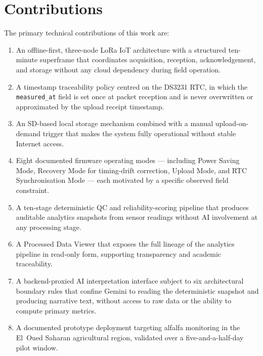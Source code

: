 \section*{Contributions}

The primary technical contributions of this work are:

\begin{enumerate}
  \item An offline-first, three-node LoRa IoT architecture with a structured
        ten-minute superframe that coordinates acquisition, reception, acknowledgement,
        and storage without any cloud dependency during field operation.
  \item A timestamp traceability policy centred on the DS3231 RTC, in which the
        \texttt{measured\_at} field is set once at packet reception and is never
        overwritten or approximated by the upload receipt timestamp.
  \item An SD-based local storage mechanism combined with a manual upload-on-demand
        trigger that makes the system fully operational without stable Internet
        access.
  \item Eight documented firmware operating modes — including Power Saving Mode,
        Recovery Mode for timing-drift correction, Upload Mode, and RTC
        Synchronisation Mode — each motivated by a specific observed field constraint.
  \item A ten-stage deterministic QC and reliability-scoring pipeline that produces
        auditable analytics snapshots from sensor readings without AI involvement at
        any processing stage.
  \item A Processed Data Viewer that exposes the full lineage of the analytics
        pipeline in read-only form, supporting transparency and academic traceability.
  \item A backend-proxied AI interpretation interface subject to six architectural
        boundary rules that confine Gemini to reading the deterministic snapshot and
        producing narrative text, without access to raw data or the ability to compute
        primary metrics.
  \item A documented prototype deployment targeting alfalfa monitoring in the
        El~Oued Saharan agricultural region, validated over a five-and-a-half-day
        pilot window.
\end{enumerate}

